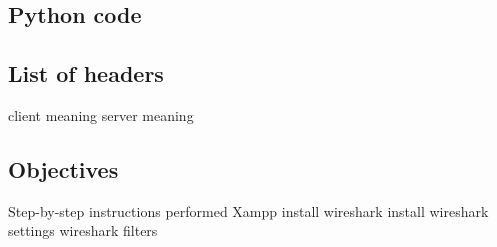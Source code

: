 \documentclass[11pt]{report}
\begin{document}
    \subsection{Python code}
        \lstset{style=pythoncode}
        
    
    \subsection{List of headers}
        client
            meaning
        server
            meaning
    
    \subsection{Objectives}
        Step-by-step instructions performed
        Xampp install
        wireshark install
        wireshark settings
        wireshark filters
        
\end{document}
